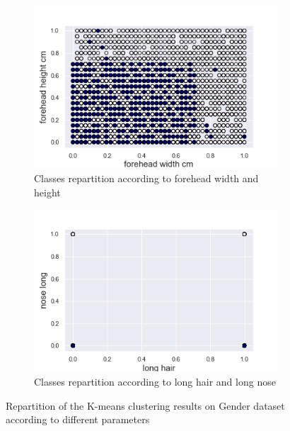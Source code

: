 \documentclass[twocolumn, 10pt]{article}
\begin{document}
			\begin{figure}[h]
				\centering
				\begin{subfigure}[t]{.49\columnwidth}
					\centering
					\includegraphics[width=\linewidth]{../graphics/kmeans_forehead_width_cm_forehead_height_cm_label.png}
					\caption{Classes repartition according to forehead width and height}
					\label{fig:g_kmeans_sep}
				\end{subfigure}
				\begin{subfigure}[t]{.49\columnwidth}
					\centering
					\includegraphics[width=\linewidth]{../graphics/kmeans_long_hair_nose_long_label.png}
					\caption{Classes repartition according to long hair and long nose}
					\label{fig:g_kmeans_pet}
				\end{subfigure}
				\caption{Repartition of the K-means clustering results on Gender dataset according to different parameters}
				\label{fig:g_kmeans}
			\end{figure}
\end{document}
